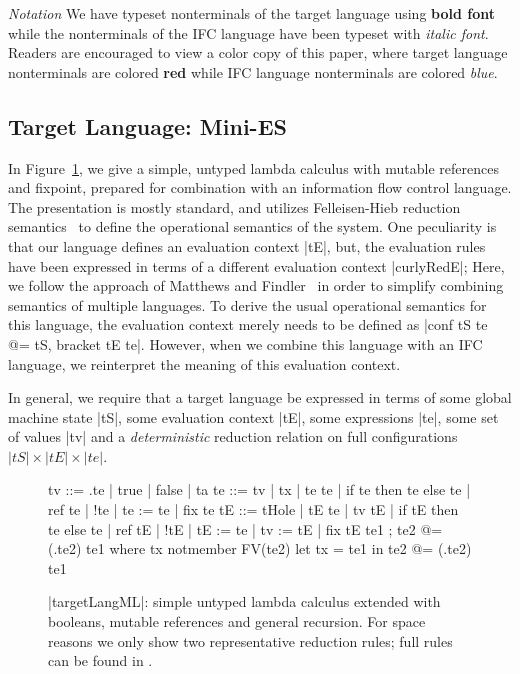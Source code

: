 \vspace{1pt}
\noindent
\textit{Notation}
We have typeset nonterminals of the target language using \textbf{{\color{red}
bold font}} while the nonterminals of the IFC language have been typeset
with \textit{{\color{blue} italic font}}.  Readers are encouraged to view
a color copy of this paper, where target language nonterminals are colored \textbf{{\color{red} red}}
while IFC language nonterminals are colored \textit{{\color{blue} blue}}.

\subsection{Target Language: Mini-ES}

In Figure~\ref{fig:ml}, we give a simple, untyped lambda calculus with
mutable references and fixpoint, prepared for combination with an
information flow control language.  The presentation is mostly standard, and utilizes Felleisen-Hieb reduction
semantics~\cite{Felleisen:1992:RRS:136293.136297} to define the
operational semantics of the system.  One peculiarity is that our language
defines an evaluation context |tE|, but, the evaluation rules have been
expressed in terms of a different evaluation context |curlyRedE|;
Here, we follow the approach of Matthews and
Findler~\cite{Matthews:2007:OSM:1190216.1190220} in order to simplify combining
semantics of multiple languages.
To derive the usual operational semantics for this language, the evaluation
context merely needs to be defined as |conf tS te @= tS, bracket tE te|.
However, when we combine this language with an IFC language, we
reinterpret the meaning of this evaluation context.

In general, we require that a target language be expressed in terms
of some global machine state |tS|, some evaluation context |tE|,
some expressions |te|, some set of values |tv| and a \emph{deterministic}
reduction relation on full configurations $|tS| \times |tE| \times |te|$.

\begin{figure}
\begin{code}
tv   ::= \tx.te | true | false | ta
te   ::= tv | tx | te te | if te then te else te | ref te | !te | te := te | fix te
tE   ::= tHole | tE te | tv tE | if tE then te else te | ref tE | !tE | tE := te | tv := tE | fix tE
te1 ; te2            @= (\tx.te2) te1  where  tx notmember FV(te2)
let tx = te1 in te2  @= (\tx.te2) te1
\end{code}

\caption{|targetLangML|: simple untyped lambda calculus extended with booleans,
mutable references and general recursion.  For space reasons we only show two
representative reduction rules;  full rules can be found in .}
\label{fig:ml}
\end{figure}

